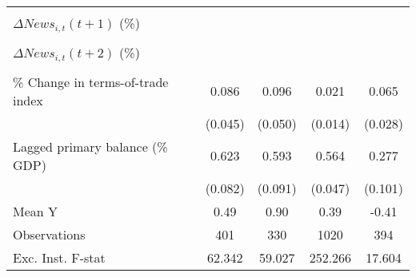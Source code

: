 {\begin{tabular}{l*{4}{c}}
                    &                     &                     &                     &                     \\
\addlinespace
$ \Delta News_{i,t}(t+1)$ (\%)&                     &                     &                     &                     \\
                    &                     &                     &                     &                     \\
\addlinespace
$ \Delta News_{i,t}(t+2)$ (\%)&                     &                     &                     &                     \\
                    &                     &                     &                     &                     \\
\addlinespace
\% Change in terms-of-trade index&       0.086\sym{*}  &       0.096\sym{*}  &       0.021         &       0.065\sym{**} \\
                    &     (0.045)         &     (0.050)         &     (0.014)         &     (0.028)         \\
\addlinespace
Lagged primary balance (\% GDP)&       0.623\sym{***}&       0.593\sym{***}&       0.564\sym{***}&       0.277\sym{***}\\
                    &     (0.082)         &     (0.091)         &     (0.047)         &     (0.101)         \\
\midrule
Mean Y              &        0.49         &        0.90         &        0.39         &       -0.41         \\
Observations        &         401         &         330         &        1020         &         394         \\
Exc. Inst. F-stat   &      62.342         &      59.027         &     252.266         &      17.604         \\
\bottomrule
\end{tabular}
}
